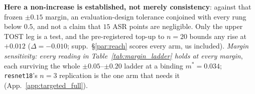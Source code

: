 \documentclass{article}
\begin{document}
\noindent \textbf{Here a non-increase is established, not merely consistency}: against that frozen $\pm0.15$ margin, an evaluation-design tolerance conjoined with every rung below $0.5$, and not a claim that $15$ ASR points are negligible. Only the upper TOST leg is a test, and the pre-registered top-up to $n{=}20$ bounds any rise at $+0.012$ ($\Delta{=}-0.010$; supp.\ §\ref{par:reach} scores every arm, us included). \emph{Margin sensitivity: every reading in Table~\ref{tab:margin_ladder} holds at every margin}, each surviving the whole $\pm0.05$--$\pm0.20$ ladder at a binding $m^\ast{=}0.034$; \texttt{resnet18}'s $n{=}3$ replication is the one arm that needs it (App.~\ref{app:targeted_full}).
\end{document}

